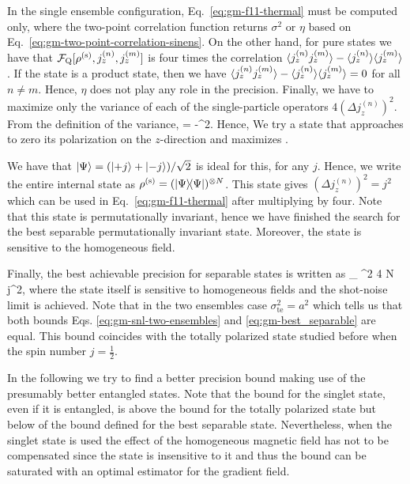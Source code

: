 In the single ensemble configuration, Eq.~\eqref{eq:gm-f11-thermal} must be computed only, where the two-point correlation function returns $\sigma^2$ or $\eta$ based on Eq.~\eqref{eq:gm-two-point-correlation-sinens}.
On the other hand, for pure states we have that $\mathcal{F}_{\textnormal{Q}}[{\textstyle \rho^{(\text{s})}, j_z^{(n)}, j_z^{(m)}}]$ is four times the correlation $\langle{j_z^{(n)}j_z^{(m)}}\rangle-\langle{j_z^{(n)}}\rangle\langle{j_z^{(m)}}\rangle$.
If the state is a product state, then we have  $\langle{j_z^{(n)}j_z^{(m)}}\rangle-\langle{j_z^{(n)}}\rangle\langle{j_z^{(m)}}\rangle=0$ for all $n\neq m$.
Hence, $\eta$ does not play any role in the precision.
Finally, we have to maximize only the variance of each of the single-particle operators $4(\Delta j_z^{(n)})^2$.
From the definition of the variance,
\be
   = -^2.
\ee
Hence, We try a state that approaches to zero its polarization on the $z$-direction and maximizes .

We have that  $\vert{\Psi}\rangle=(\vert{+j}\rangle+\vert{-j}\rangle)/\sqrt{2}$ is ideal for this, for any $j$.
Hence, we write the entire internal state as $\rho^{(\text{s})} =(\vert{\Psi}\rangle{\!}\langle{\Psi}\vert)^{\otimes N}$.
This state gives $(\Delta j_z^{(n)})^2=j^2$ which can be used in Eq.~\eqref{eq:gm-f11-thermal} after multiplying by four.
Note that this state is permutationally invariant, hence we have finished the search for the best separable permutationally invariant state.
Moreover, the state is sensitive to the homogeneous field.

Finally, the best achievable precision for separable states is written as
\be
  _{} \leqslant  \sigma^2 4 N j^2,
  \label{eq:gm-best_separable}
\ee
where the state itself is sensitive to homogeneous fields and the shot-noise limit is achieved.
Note that in the two ensembles case $\sigma^2_{\text{te}}=a^2$ which tells us that both bounds Eqs. \eqref{eq:gm-snl-two-ensembles} and \eqref{eq:gm-best_separable} are equal.
This bound coincides with the totally polarized state studied before when the spin number $j=\frac{1}{2}$.

In the following we try to find a better precision bound making use of the presumably better entangled states.
Note that the bound for the singlet state, even if it is entangled, is above the bound for the totally polarized state but below of the bound defined for the best separable state.
Nevertheless, when the singlet state is used the effect of the homogeneous magnetic field has not to be compensated since the state is insensitive to it and thus the bound can be saturated with an optimal estimator for the gradient field.

